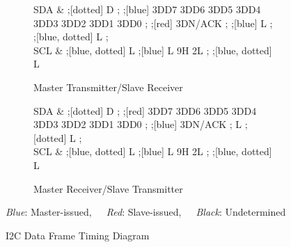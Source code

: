 \begin{figure}[h]
	\centering
	\begin{subfigure}[t]{\textwidth}
		\centering
		\begin{tikztimingtable}[timing/font=\rmfamily, timing/d/text/.append style={font=\rmfamily}, xscale=1.5, yscale=2, timing/slope=0.2, timing/dslope=0.2, timing/d/background/.style={fill=white},
			timing/metachar={{K}[2]{#1H !{++(-.5\xunit + 0.5*\slope\xunit, -.5\yunit)} N[rectangle,scale=.6]{#2} !{++(.5\xunit - 0.5*\slope\xunit, +.5\yunit)}}},
			timing/metachar={{J}[2]{#1L !{++(-.5\xunit + 0.5*\slope\xunit, +.5\yunit)} N[rectangle,scale=.6]{#2} !{++(.5\xunit - 0.5*\slope\xunit, -.5\yunit)}}},]
			SDA & ;[dotted] D{} ; ;[blue] 3D{D7} 3D{D6} 3D{D5} 3D{D4} 3D{D3} 3D{D2} 3D{D1} 3D{D0} ; ;[red] 3D{N/ACK} ; ;[blue] L ; ;[blue, dotted] L ; \\
			SCL & ;[blue, dotted] L ;[blue] L 9{H 2L} ; ;[blue, dotted] L \\
			\begin{extracode}
			\end{extracode}
		\end{tikztimingtable}
		\caption{Master Transmitter/Slave Receiver}
		\label{fig:i2c-data-frame-timing-diagram-master-transmitter}
	\end{subfigure}
	\par\bigskip\bigskip
	\begin{subfigure}[b]{\textwidth}
		\centering
		\begin{tikztimingtable}[timing/font=\rmfamily, timing/d/text/.append style={font=\rmfamily}, xscale=1.5, yscale=2, timing/slope=0.2, timing/dslope=0.2, timing/d/background/.style={fill=white},
			timing/metachar={{K}[2]{#1H !{++(-.5\xunit + 0.5*\slope\xunit, -.5\yunit)} N[rectangle,scale=.6]{#2} !{++(.5\xunit - 0.5*\slope\xunit, +.5\yunit)}}},
			timing/metachar={{J}[2]{#1L !{++(-.5\xunit + 0.5*\slope\xunit, +.5\yunit)} N[rectangle,scale=.6]{#2} !{++(.5\xunit - 0.5*\slope\xunit, -.5\yunit)}}},]
			SDA & ;[dotted] D{} ; ;[red] 3D{D7} 3D{D6} 3D{D5} 3D{D4} 3D{D3} 3D{D2} 3D{D1} 3D{D0} ; ;[blue] 3D{N/ACK} ; L ;[dotted] L ; \\
			SCL & ;[blue, dotted] L ;[blue] L 9{H 2L} ; ;[blue, dotted] L \\
			\begin{extracode}
				\timingaxis{2}
			\end{extracode}
		\end{tikztimingtable}
		\caption{Master Receiver/Slave Transmitter}
		\label{fig:i2c-data-frame-timing-diagram-master-receiver}
	\end{subfigure}

	{\color{blue}\textit{Blue}: Master-issued},~~~{\color{red}\textit{Red}: Slave-issued},~~~\textit{Black}: Undetermined
	\caption{I2C Data Frame Timing Diagram}
	\label{fig:i2c-data-frame-timing-diagram}
\end{figure}

